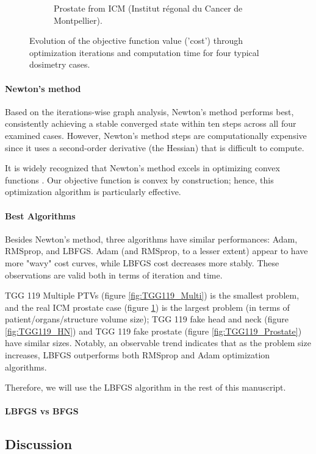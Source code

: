 \begin{figure}
\begin{subfigure}{\textwidth}
		\caption{Prostate from ICM (Institut régonal du Cancer de Montpellier).}
		\label{fig:ICM_Prostate}
	\end{subfigure}
	\caption{Evolution of the objective function value ('cost') through optimization iterations and computation time for four typical dosimetry cases.}
	\label{fig:OptimizersComparison}
\end{figure}

\paragraph{Newton's method}
Based on the iterations-wise graph analysis, Newton's method performs best, consistently achieving a stable converged state within ten steps across all four examined cases.
However, Newton's method steps are computationally expensive since it uses a second-order derivative (the Hessian) that is difficult to compute.

It is widely recognized that Newton's method excels in optimizing convex functions \cite{PoczosTibshirani2013}.
Our objective function is convex by construction; hence, this optimization algorithm is particularly effective.

\paragraph{Best Algorithms}
Besides Newton's method, three algorithms have similar performances: Adam, RMSprop, and LBFGS.
Adam (and RMSprop, to a lesser extent) appear to have more "wavy" cost curves, while LBFGS cost decreases more stably.
These observations are valid both in terms of iteration and time.

TGG 119 Multiple PTVs (figure \ref{fig:TGG119_Multi}) is the smallest problem, and the real ICM prostate case (figure \ref{fig:ICM_Prostate}) is the largest problem (in terms of patient/organs/structure volume size);
TGG 119 fake head and neck (figure \ref{fig:TGG119_HN}) and TGG 119 fake prostate (figure \ref{fig:TGG119_Prostate}) have similar sizes.
Notably, an observable trend indicates that as the problem size increases, LBFGS outperforms both RMSprop and Adam optimization algorithms.

Therefore, we will use the LBFGS algorithm in the rest of this manuscript.

\paragraph{LBFGS vs BFGS}

\subsection{Discussion}

